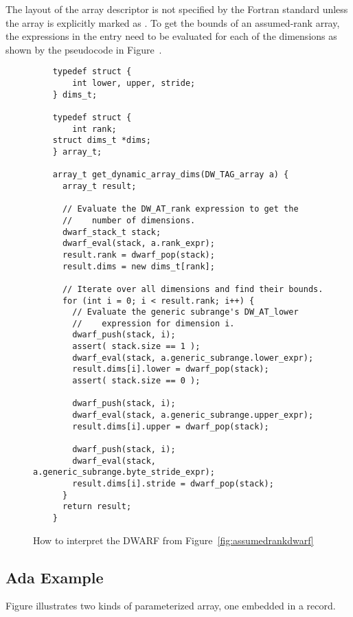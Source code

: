 The layout of the array descriptor is not specified by the Fortran
standard unless the array is explicitly marked as . To
get the bounds of an assumed-rank array, the expressions in the
\DWTAGgenericsubrange
entry need to be evaluated for each of the
\DWATrank{} dimensions as shown by the pseudocode in
Figure~.

\begin{figure}[!h]
\begin{lstlisting}
    typedef struct {
        int lower, upper, stride;
    } dims_t;

    typedef struct {
        int rank;
    struct dims_t *dims;
    } array_t;

    array_t get_dynamic_array_dims(DW_TAG_array a) {
      array_t result;

      // Evaluate the DW_AT_rank expression to get the 
      //    number of dimensions.
      dwarf_stack_t stack;
      dwarf_eval(stack, a.rank_expr);
      result.rank = dwarf_pop(stack); 
      result.dims = new dims_t[rank];

      // Iterate over all dimensions and find their bounds.
      for (int i = 0; i < result.rank; i++) {
        // Evaluate the generic subrange's DW_AT_lower 
        //    expression for dimension i.
        dwarf_push(stack, i);
        assert( stack.size == 1 );
        dwarf_eval(stack, a.generic_subrange.lower_expr);
        result.dims[i].lower = dwarf_pop(stack);
        assert( stack.size == 0 );

        dwarf_push(stack, i);
        dwarf_eval(stack, a.generic_subrange.upper_expr);
        result.dims[i].upper = dwarf_pop(stack);
    
        dwarf_push(stack, i);
        dwarf_eval(stack, a.generic_subrange.byte_stride_expr);
        result.dims[i].stride = dwarf_pop(stack);
      }
      return result;
    }
\end{lstlisting}
\caption{How to interpret the DWARF from Figure~\ref{fig:assumedrankdwarf}}
\label{fig:assumedrankdwarfparser}
\end{figure}



\clearpage
\subsection{Ada Example}
\label{app:adaexample}
Figure 
illustrates two kinds of  
parameterized array, one embedded in a record.

